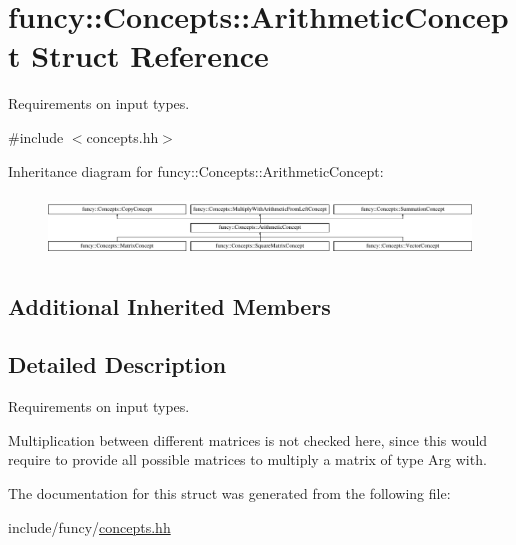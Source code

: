 \hypertarget{structfuncy_1_1Concepts_1_1ArithmeticConcept}{\section{funcy\-:\-:Concepts\-:\-:Arithmetic\-Concept Struct Reference}
\label{structfuncy_1_1Concepts_1_1ArithmeticConcept}
}


Requirements on input types.  




{\ttfamily \#include $<$concepts.\-hh$>$}

Inheritance diagram for funcy\-:\-:Concepts\-:\-:Arithmetic\-Concept\-:\begin{figure}[H]
\begin{center}
\leavevmode
\includegraphics[height=1.656805cm]{structfuncy_1_1Concepts_1_1ArithmeticConcept}
\end{center}
\end{figure}
\subsection*{Additional Inherited Members}


\subsection{Detailed Description}
Requirements on input types. 

Multiplication between different matrices is not checked here, since this would require to provide all possible matrices to multiply a matrix of type Arg with. 

The documentation for this struct was generated from the following file\-:\begin{DoxyCompactItemize}
\item 
include/funcy/\hyperlink{concepts_8hh}{concepts.\-hh}\end{DoxyCompactItemize}
